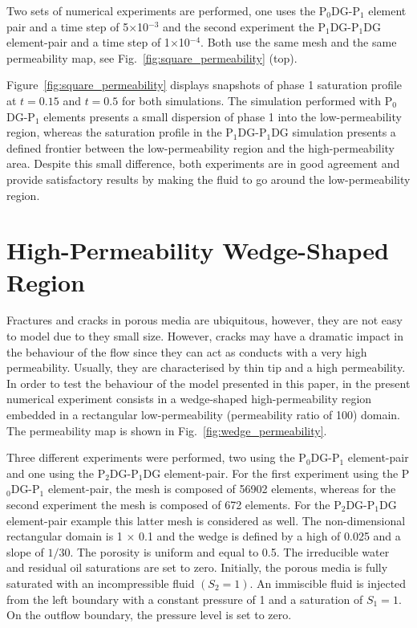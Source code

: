 \documentclass[preprint,authoryear,12pt]{elsarticle}
\newcommand{\PN}[2][error]{P$_{#1}$DG-P$_{#2}$}
\begin{document}
Two sets of numerical experiments are performed, one uses the
\PN[0]{1} element pair and a time step of 5$\times$10$^{-3}$ and the
second experiment the \PN[1]{1}DG element-pair and a time step of
1$\times$10$^{-4}$. Both use the same mesh and the same permeability
map, see Fig.~\ref{fig:square_permeability} (top).

Figure~\ref{fig:square_permeability} displays snapshots of phase 1
saturation profile at $t = 0.15$ and $t = 0.5$ for both
simulations. The simulation performed with \PN[0]{1} elements presents
a small dispersion of phase 1 into the low-permeability region,
whereas the saturation profile in the \PN[1]{1}DG simulation presents
a defined frontier between the low-permeability region and the
high-permeability area. Despite this small difference, both
experiments are in good agreement and provide satisfactory results by
making the fluid to go around the low-permeability region.

\section{High-Permeability Wedge-Shaped Region}\label{res4}
Fractures and cracks in porous media are ubiquitous, however, they are
not easy to model due to they small size. However, cracks may have a
dramatic impact in the behaviour of the flow since they can act as
conducts with a very high permeability. Usually, they are
characterised by thin tip and a high permeability. In order to test
the behaviour of the model presented in this paper, in the present
numerical experiment consists in a wedge-shaped high-permeability
region embedded in a rectangular low-permeability (permeability ratio
of 100) domain. The permeability map is shown in
Fig.~\ref{fig:wedge_permeability}.

Three different experiments were performed, two using the \PN[0]{1}
element-pair and one using the \PN[2]{1}DG element-pair. For the first
experiment using the \PN[0]{1} element-pair, the mesh is composed of
56902 elements, whereas for the second experiment the mesh is composed
of 672 elements. For the \PN[2]{1}DG element-pair example this latter
mesh is considered as well. The non-dimensional rectangular domain is
1 $\times$ 0.1 and the wedge is defined by a high of 0.025 and a slope
of $1/30$. The porosity is uniform and equal to 0.5. The irreducible
water and residual oil saturations are set to zero. Initially, the
porous media is fully saturated with an incompressible fluid
$\left(S_{2}=1\right)$. An immiscible fluid is injected from the left
boundary with a constant pressure of 1 and a saturation of
$S_{1}=1$. On the outflow boundary, the pressure level is set to zero.
\end{document}
